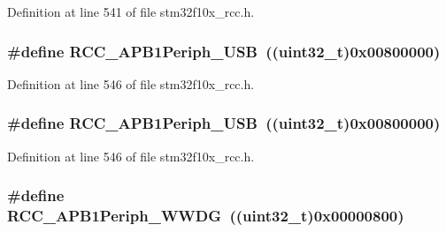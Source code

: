 Definition at line 541 of file stm32f10x\+\_\+rcc.\+h.

\subsubsection[{\texorpdfstring{R\+C\+C\+\_\+\+A\+P\+B1\+Periph\+\_\+\+U\+SB}{RCC_APB1Periph_USB}}]{\setlength{\rightskip}{0pt plus 5cm}\#define R\+C\+C\+\_\+\+A\+P\+B1\+Periph\+\_\+\+U\+SB~(({\bf uint32\+\_\+t})0x00800000)}\hypertarget{group___a_p_b1__peripheral_ga69a1b3de9a59155bc8455eea5a15e3e4}{}\label{group___a_p_b1__peripheral_ga69a1b3de9a59155bc8455eea5a15e3e4}


Definition at line 546 of file stm32f10x\+\_\+rcc.\+h.

\subsubsection[{\texorpdfstring{R\+C\+C\+\_\+\+A\+P\+B1\+Periph\+\_\+\+U\+SB}{RCC_APB1Periph_USB}}]{\setlength{\rightskip}{0pt plus 5cm}\#define R\+C\+C\+\_\+\+A\+P\+B1\+Periph\+\_\+\+U\+SB~(({\bf uint32\+\_\+t})0x00800000)}\hypertarget{group___a_p_b1__peripheral_ga69a1b3de9a59155bc8455eea5a15e3e4}{}\label{group___a_p_b1__peripheral_ga69a1b3de9a59155bc8455eea5a15e3e4}


Definition at line 546 of file stm32f10x\+\_\+rcc.\+h.

\subsubsection[{\texorpdfstring{R\+C\+C\+\_\+\+A\+P\+B1\+Periph\+\_\+\+W\+W\+DG}{RCC_APB1Periph_WWDG}}]{\setlength{\rightskip}{0pt plus 5cm}\#define R\+C\+C\+\_\+\+A\+P\+B1\+Periph\+\_\+\+W\+W\+DG~(({\bf uint32\+\_\+t})0x00000800)}\hypertarget{group___a_p_b1__peripheral_gad84e40be78ddc40b8eae1c2b0898f6b1}{}\label{group___a_p_b1__peripheral_gad84e40be78ddc40b8eae1c2b0898f6b1}


